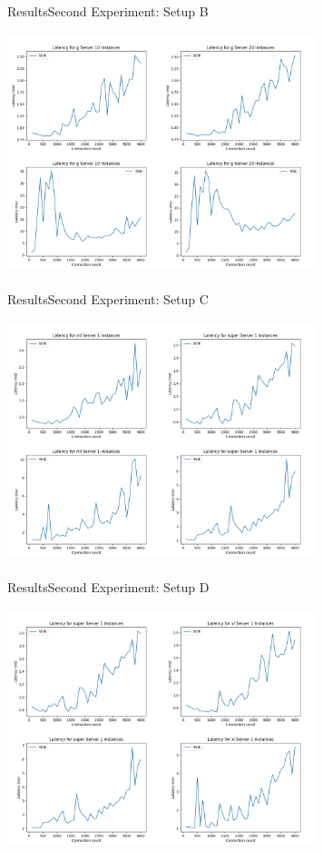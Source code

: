 \documentclass{beamer}
\begin{document}
\begin{frame}{Results}{Second Experiment: Setup B}
  \begin{center}
   \includegraphics[height=7cm, width=9cm]{figures/g10_20.png}
  \end{center}
\end{frame}

\begin{frame}{Results}{Second Experiment: Setup C}
  \begin{center}
   \includegraphics[height=7cm, width=9cm]{figures/ml1_super1.png}
  \end{center}
\end{frame}

\begin{frame}{Results}{Second Experiment: Setup D}
  \begin{center}
   \includegraphics[height=7cm, width=9cm]{figures/super1_xl1.png}
  \end{center}
\end{frame}
\end{document}
